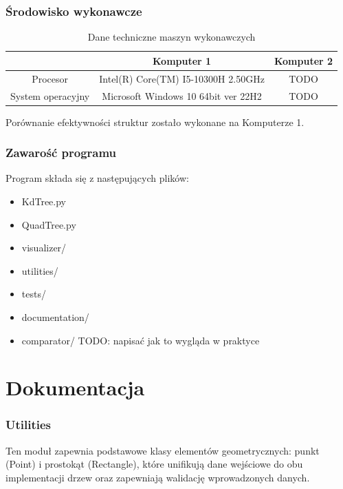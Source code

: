 \documentclass{lab}
\begin{document}
\section{Środowisko wykonawcze}
\begin{table}[h]
\centering
\begin{tabular}{|c|c|c|}
\hline
 & Komputer 1 & Komputer 2 \\
\hline
Procesor & Intel(R) Core(TM) I5-10300H 2.50GHz & TODO \\
\hline
System operacyjny & Microsoft Windows 10 64bit ver 22H2 & TODO \\
\hline
\end{tabular}
\caption{Dane techniczne maszyn wykonawczych}
\end{table}
Porównanie efektywności struktur zostało wykonane na Komputerze 1.
\section{Zawarość programu}
Program składa się z następujących plików:
\begin{itemize}
    \item KdTree.py
    \item QuadTree.py
    \item visualizer/
    \item utilities/
    \item tests/
    \item documentation/
    \item comparator/
    TODO: napisać jak to wygląda w praktyce
\end{itemize}

\part{Dokumentacja}
\section{Utilities}
Ten moduł zapewnia podstawowe klasy elementów geometrycznych: punkt (Point) i prostokąt (Rectangle), które unifikują dane wejściowe do obu implementacji drzew oraz zapewniają walidację wprowadzonych danych.
\end{document}
